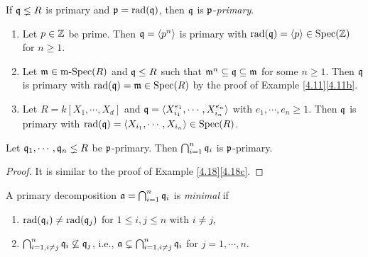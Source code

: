 \begin{definition}\label{4.20}
    If $\mathfrak{q} \lneq R$ is primary and $\mathfrak{p} = \operatorname{rad}(\mathfrak{q})$, then $\mathfrak{q}$ is $\mathfrak{p}$-\emph{primary}.
\end{definition}

\begin{example}\label{4.21}
    \begin{enumerate}
        \item Let $p \in \mathbb{Z}$ be prime. Then $\mathfrak{q} = \langle  p^{n} \rangle$ is primary with $\operatorname{rad}(\mathfrak{q}) = \langle p  \rangle \in \operatorname{Spec}(\mathbb{Z})$ for $n \geq 1$.
        \item 
            Let $\mathfrak{m} \in \operatorname{m-Spec}(R)$ and $\mathfrak{q} \leq R$ such that $\mathfrak{m}^{n} \subseteq \mathfrak{q} \subseteq \mathfrak{m}$ for some $n \geq 1$. Then $\mathfrak{q}$ is primary with $\operatorname{rad}(\mathfrak{q}) = \mathfrak{m} \in \operatorname{Spec}(R)$ by the proof of Example \ref{4.11}\ref{4.11b}.
        \item Let $R = k[X_1,\cdots,X_d]$ and $\mathfrak{q} = \langle X_{i_1}^{e_{1}},\cdots,X_{i_n}^{e_{n}} \rangle$ with $e_1, \cdots, e_n \geq 1$. Then $\mathfrak{q}$ is primary with $\operatorname{rad}(\mathfrak{q}) = \langle X_{i_1},\cdots,X_{i_n} \rangle \in \operatorname{Spec}(R)$.
    \end{enumerate}
\end{example}

\begin{proposition}\label{4.22}
    Let $\mathfrak{q}_1,\cdots,\mathfrak{q}_n \lneq R$ be $\mathfrak{p}$-primary. Then $\bigcap_{i=1}^{n} \mathfrak{q}_i$ is $\mathfrak{p}$-primary.
\end{proposition}

\begin{proof}
    It is similar to the proof of Example \ref{4.18}\ref{4.18c}.
\end{proof}

\begin{definition}\label{4.23}
    A primary decomposition $\mathfrak{a} = \bigcap_{i=1}^{n}\mathfrak{q}_i$ is \emph{minimal} if 
    \begin{enumerate}
        \item $\operatorname{rad}(\mathfrak{q}_i) \neq \operatorname{rad}(\mathfrak{q}_j)$ for $1 \leq i,j \leq n$ with $i \neq j$,
        \item $\bigcap_{i=1,i \neq j}^{n} \mathfrak{q}_i \not \subseteq \mathfrak{q}_j$, i.e., $\mathfrak{a} \subsetneq \bigcap_{i=1, i \neq j}^{n} \mathfrak{q}_i$ for $j = 1,\cdots,n$.
    \end{enumerate}
\end{definition}


